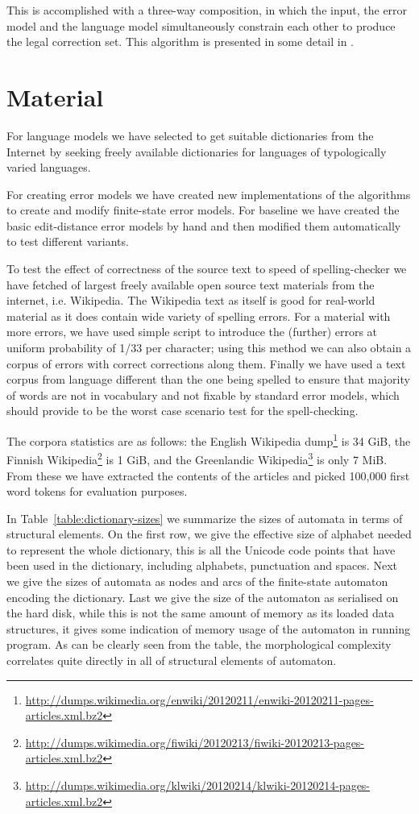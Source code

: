 \documentclass[11pt]{article}
\begin{document}
This is accomplished with a three-way composition, in which the input, the
error model and the language model simultaneously constrain each other to
produce the legal correction set. This algorithm is presented in some detail
in .

\section{Material}
\label{sec:materials}

For language models we have selected to get suitable dictionaries from the
Internet by seeking freely available dictionaries for languages of
typologically varied languages.

For creating error models we have created new implementations of the algorithms
to create and modify finite-state error models. For baseline we have created
the basic edit-distance error models by hand and then modified them
automatically to test different variants.

To test the effect of correctness of the source text to speed of
spelling-checker we have fetched of largest freely available open source text
materials from the internet, i.e. Wikipedia. The Wikipedia text as itself is
good for real-world material as it does contain wide variety of spelling
errors. For a material with more errors, we have used simple script to
introduce the (further) errors at uniform probability of 1/33 per character;
using this method we can also obtain a corpus of errors with correct
corrections along them.  Finally we have used a text corpus from language
different than the one being spelled to ensure that majority of words are not
in vocabulary and not fixable by standard error models, which should provide to
be the worst case scenario test for the spell-checking.

The corpora statistics are as follows: the English Wikipedia
dump\footnote{\url{http://dumps.wikimedia.org/enwiki/20120211/enwiki-20120211-pages-articles.xml.bz2}}
is 34 GiB, the Finnish
Wikipedia\footnote{\url{http://dumps.wikimedia.org/fiwiki/20120213/fiwiki-20120213-pages-articles.xml.bz2}}
is 1 GiB, and the Greenlandic
Wikipedia\footnote{\url{http://dumps.wikimedia.org/klwiki/20120214/klwiki-20120214-pages-articles.xml.bz2}}
is only 7 MiB. From these we have extracted the contents of the articles and
picked 100,000 first word tokens for evaluation purposes.

In Table~\ref{table:dictionary-sizes} we summarize the sizes of automata in
terms of structural elements. On the first row, we give the effective size of
alphabet needed to represent the whole dictionary, this is all the Unicode
code points that have been used in the dictionary, including alphabets, 
punctuation and spaces. Next we give the sizes of automata as nodes and
arcs of the finite-state automaton encoding the dictionary. Last we give the
size of the automaton as serialised on the hard disk, while this is not the
same amount of memory as its loaded data structures, it gives some indication
of memory usage of the automaton in running program. As can be clearly
seen from the table, the morphological complexity correlates quite directly
in all of structural elements of automaton.
\end{document}
